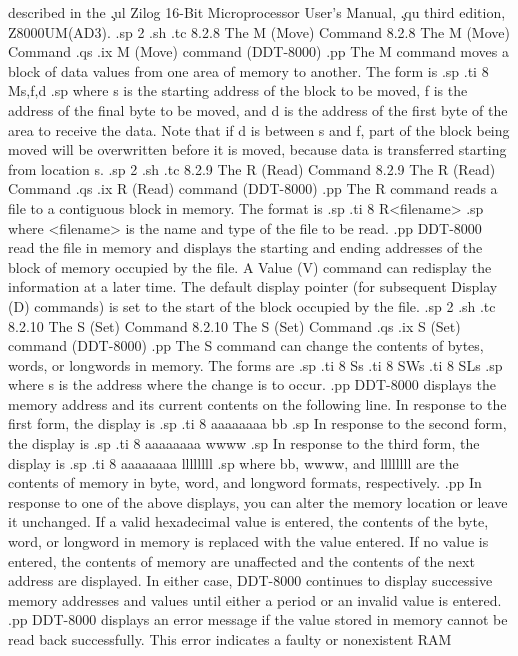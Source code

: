 described in the \c 
.ul
Zilog 16-Bit Microprocessor User's Manual, \c
.qu
third edition, Z8000UM(AD3).
.sp 2
.sh
.tc         8.2.8  The M (Move) Command
8.2.8  The M (Move) Command
.qs
.ix M (Move) command (DDT-8000)
.pp 
The M command moves a block of data values from one area of memory to 
another.  The form is
.sp
.ti 8
Ms,f,d
.sp
where s is the starting address of the block to be moved, f is the address of 
the final byte to be moved, and d is the address of the first byte of the 
area to receive the data.  Note that if d is between s and f, part of the 
block being moved will be overwritten before it is moved, because data is 
transferred starting from location s.
.sp 2
.sh
.tc         8.2.9  The R (Read) Command
8.2.9  The R (Read) Command
.qs
.ix R (Read) command (DDT-8000)
.pp
The R command reads a file to a contiguous block in memory.  The 
format is
.sp
.ti 8
R<filename>
.sp
where <filename> is the name and type of the file to be read.
.pp
DDT-8000 read the file in memory and displays the starting and 
ending addresses of the block of memory occupied by the file.  A 
Value (V) command can redisplay the information at a later time.  The 
default display pointer (for subsequent Display (D) commands) is set to 
the start of the block occupied by the file.
.sp 2
.sh
.tc         8.2.10  The S (Set) Command
8.2.10  The S (Set) Command
.qs
.ix S (Set) command (DDT-8000)
.pp 
The S command can change the contents of bytes, words, or longwords in
memory.  The forms are
.sp
.ti 8
Ss
.ti 8
SWs
.ti 8
SLs
.sp
where s is the address where the change is to occur.
.pp 
DDT-8000 displays the memory address and its current contents on the following
line.  In response to the first form, the display is
.sp
.ti 8
aaaaaaaa bb
.sp
In response to the second form, the display is 
.sp
.ti 8
aaaaaaaa wwww
.sp
In response to the third form, the display is
.sp
.ti 8
aaaaaaaa llllllll
.sp
where bb, wwww, and llllllll are the contents of memory in byte, word, 
and longword formats, respectively.
.pp 
In response to one of the above displays, you can alter the
memory location or leave it unchanged.  If a valid hexadecimal value is 
entered, the contents of the byte, word, or longword in memory is replaced 
with the value entered.  If no value is entered, the contents of memory are 
unaffected and the contents of the next address are displayed.  In either
case, DDT-8000 continues to display successive memory addresses and values
until either a period or an invalid value is entered.
.pp 
DDT-8000 displays an error message if the value stored in memory cannot be
read back successfully.  This error indicates a faulty or nonexistent RAM
